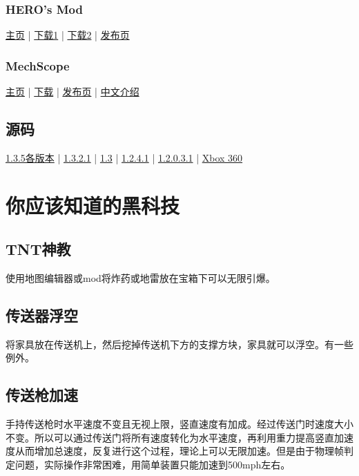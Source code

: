 \subsection{HERO's Mod}\label{app6}
\href{https://github.com/JavidPack/HEROsMod}{主页} | \href{http://javid.ddns.net/tModLoader/download.php?Down=mods/HEROsMod.tmod}{下载1} | \href{https://github.com/JavidPack/HEROsMod/releases}{下载2} | \href{https://forums.terraria.org/index.php?threads/heros-mod-creative-mode-server-management-and-over-25-tools-1-3-4-4-compatible.44650/}{发布页}

\subsection{MechScope}\label{app7}
\href{https://github.com/DRKV333/MechScope}{主页} | \href{https://github.com/DRKV333/MechScope/releases/}{下载} | \href{https://forums.terraria.org/index.php?threads/mechscope-wiring-visualized.70665/}{发布页} | \href{https://www.bilibili.com/read/cv2222687}{中文介绍}

\section{源码}\label{app8}
\href{https://github.com/Pryaxis/Sources}{1.3.5各版本} | \href{https://github.com/NoviaDroid/TerrariaRefractoring_1.3.2.1}{1.3.2.1} | \href{https://github.com/saniainf/EDTerraria}{1.3} | \href{https://github.com/EdgeKiller/terrariaSource}{1.2.4.1} | \href{https://github.com/TheVamp/Terraria-Source-Code}{1.2.0.3.1} | \href{https://github.com/dptug/TerrariaXDK}{Xbox 360}

\chapter{你应该知道的黑科技}
\section{TNT神教}使用地图编辑器或mod将炸药或地雷放在宝箱下可以无限引爆。
\section{传送器浮空}将家具放在传送机上，然后挖掉传送机下方的支撑方块，家具就可以浮空。有一些例外。
\section{传送枪加速}手持传送枪时水平速度不变且无视上限，竖直速度有加成。经过传送门时速度大小不变。所以可以通过传送门将所有速度转化为水平速度，再利用重力提高竖直加速度从而增加总速度，反复进行这个过程，理论上可以无限加速。但是由于物理帧判定问题，实际操作非常困难，用简单装置只能加速到500mph左右。

